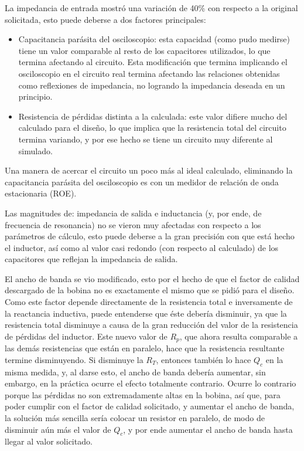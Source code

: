 \documentclass{article}
\begin{document}
La impedancia de entrada mostró una variación de 40\% con respecto a la original solicitada, esto puede deberse a dos factores principales:
\begin{itemize}
    \item Capacitancia parásita del osciloscopio: esta capacidad (como pudo medirse) tiene un valor comparable al resto de los capacitores utilizados, lo que termina afectando al circuito. Esta modificación que termina implicando el osciloscopio en el circuito real termina afectando las relaciones obtenidas como reflexiones de impedancia, no logrando la impedancia deseada en un principio.
    \item Resistencia de pérdidas distinta a la calculada: este valor difiere mucho del calculado para el diseño, lo que implica que la resistencia total del circuito termina variando, y por ese hecho se tiene un circuito muy diferente al simulado. 
\end{itemize}
\noindent Una manera de acercar el circuito un poco más al ideal calculado, eliminando la capacitancia parásita del osciloscopio es con un medidor de relación de onda estacionaria (ROE).

Las magnitudes de: impedancia de salida e inductancia (y, por ende, de frecuencia de resonancia) no se vieron muy afectadas con respecto a los parámetros de cálculo, esto puede deberse a la gran precisión con que está hecho el inductor, así como al valor casi redondo (con respecto al calculado) de los capacitores que reflejan la impedancia de salida.

El ancho de banda se vio modificado, esto por el hecho de que el factor de calidad descargado de la bobina no es exactamente el mismo que se pidió para el diseño. Como este factor depende directamente de la resistencia total e inversamente de la reactancia inductiva, puede entenderse que éste debería disminuir, ya que la resistencia total disminuye a causa de la gran reducción del valor de la resistencia de pérdidas del inductor. Este nuevo valor de $R_p$, que ahora resulta comparable a las demás resistencias que están en paralelo, hace que la resistencia resultante termine disminuyendo. Si disminuye la $R_T$, entonces también lo hace $Q_c$ en la misma medida, y, al darse esto, el ancho de banda debería aumentar, sin embargo, en la práctica ocurre el efecto totalmente contrario. Ocurre lo contrario porque las pérdidas no son extremadamente altas en la bobina, así que, para poder cumplir con el factor de calidad solicitado, y aumentar el ancho de banda, la solución más sencilla sería colocar un resistor en paralelo, de modo de disminuir aún más el valor de $Q_c$, y por ende aumentar el ancho de banda hasta llegar al valor solicitado.
\end{document}
